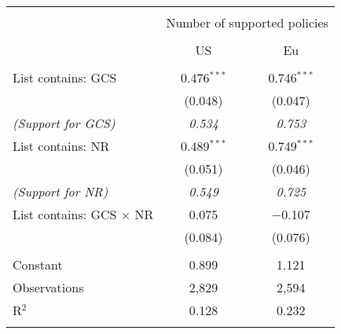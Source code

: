 
\begin{tabular}{@{\extracolsep{5pt}}lcc} 
\\[-1.8ex]\hline 
\hline \\[-1.8ex] 
 & \multicolumn{2}{c}{Number of supported policies} \\ 
\cline{2-3} 
\\[-1.8ex] & US & Eu \\ 
\hline \\[-1.8ex] 
 List contains: GCS & 0.476$^{***}$ & 0.746$^{***}$ \\ 
  & (0.048) & (0.047) \\ 
\textit{(Support for GCS)} & \textit{ 0.534 } & \textit{ 0.753 }\\
  List contains: NR & 0.489$^{***}$ & 0.749$^{***}$ \\ 
  & (0.051) & (0.046) \\ 
\textit{(Support for NR)} & \textit{ 0.549 } & \textit{ 0.725 }\\
  List contains: GCS $\times$ NR & 0.075 & $-$0.107 \\ 
  & (0.084) & (0.076) \\ 
 \hline \\[-1.8ex] 
Constant & 0.899 & 1.121 \\ 
Observations & 2,829 & 2,594 \\ 
R$^{2}$ & 0.128 & 0.232 \\ 
\hline 
\hline \\[-1.8ex] 
\end{tabular} 